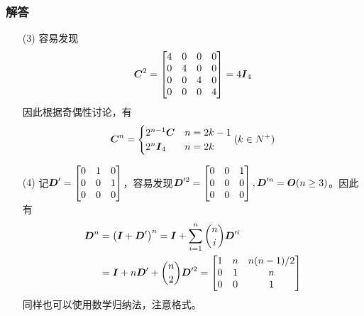 \documentclass{beamer}
\begin{document}
\begin{frame}[allowframebreaks]
\frametitle{解答}

    \begin{enumerate}

        \item[(3)]
            {
            容易发现
            \begin{equation*}
                \boldsymbol{C}^2=
                \begin{bmatrix}
                    4 & 0 & 0 & 0 \\
                    0 & 4 & 0 & 0 \\
                    0 & 0 & 4 & 0 \\
                    0 & 0 & 0 & 4
                \end{bmatrix}=4\boldsymbol{I}_4
            \end{equation*}
            因此根据奇偶性讨论，有
            \begin{equation*}
                \boldsymbol{C}^n=
                \begin{cases}
                    2^{n-1}\boldsymbol{C} & n=2k-1 \\
                    2^n\boldsymbol{I}_4   & n=2k
                \end{cases}
                (k\in N^+)
            \end{equation*}
            }
            \pause
        \item[(4)]
            {
            记\(\boldsymbol{D}'=\begin{bmatrix}0&1&0\\0&0&1\\0&0&0\end{bmatrix}\)，容易发现\(\boldsymbol{D}'^2=\begin{bmatrix}0&0&1\\0&0&0\\0&0&0\end{bmatrix},\boldsymbol{D}'^n=\boldsymbol{O}(n\ge3)\)。因此有
            \begin{align*}
                \boldsymbol{D}^n & =\left( \boldsymbol{I}+\boldsymbol{D}' \right)^n=\boldsymbol{I}+\sum_{i=1}^n\binom{n}{i}\boldsymbol{D}'^i \\
                        & =\boldsymbol{I}+n\boldsymbol{D}'+\binom{n}{2}\boldsymbol{D}'^2=\begin{bmatrix}
                    1 & n & n(n-1)/2 \\
                    0 & 1 & n        \\
                    0 & 0 & 1
                \end{bmatrix}
            \end{align*}
同样也可以使用数学归纳法，注意格式。
            }
    \end{enumerate}

\end{frame}
\end{document}
